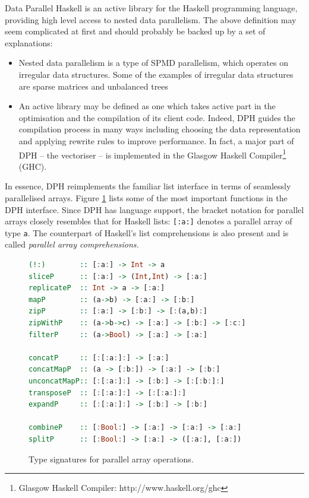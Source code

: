 \documentclass[preamble.tex]{subfiles}
\begin{document}
Data Parallel Haskell is an active library for the Haskell programming language, providing high level access to nested data parallelism. The above definition may seem complicated at first and should probably be backed up by a set of explanations:
\begin{itemize}
\item Nested data parallelism is a type of SPMD parallelism, which operates on irregular data structures. Some of the examples of irregular data structures are sparse matrices and unbalanced trees

\item An active library may be defined as one which takes active part in the optimisation and the compilation of its client code. Indeed, DPH guides the compilation process in many ways including choosing the data representation \cite{CDL09} and applying rewrite rules \cite{PTH01} to improve performance. In fact, a major part of DPH -- the vectoriser -- is implemented in the Glasgow Haskell Compiler\footnote{Glasgow Haskell Compiler: http://www.haskell.org/ghc} (GHC).

\end{itemize}
In essence, DPH reimplements the familiar list interface in terms of seamlessly parallelised arrays. Figure \ref{fig:Lit:DPH-interface-functions} lists some of the most important functions in the DPH interface. Since DPH has language support, the bracket notation for parallel arrays closely resembles that for Haskell lists: \lstinline[basicstyle={\ttfamily}]![:a:]! denotes a parallel array of type \lstinline[basicstyle={\ttfamily}]!a!. The counterpart of Haskell's list comprehensions is also present and is called \emph{parallel array comprehensions.}

\begin{figure}
\begin{lstlisting}[basicstyle={\ttfamily},language=Haskell,tabsize=4]
(!:)		:: [:a:] -> Int -> a
sliceP		:: [:a:] -> (Int,Int) -> [:a:]
replicateP	:: Int -> a -> [:a:]
mapP		:: (a->b) -> [:a:] -> [:b:]
zipP		:: [:a:] -> [:b:] -> [:(a,b):]
zipWithP	:: (a->b->c) -> [:a:] -> [:b:] -> [:c:]
filterP		:: (a->Bool) -> [:a:] -> [:a:]

concatP		:: [:[:a:]:] -> [:a:]
concatMapP	:: (a -> [:b:]) -> [:a:] -> [:b:]
unconcatMapP:: [:[:a:]:] -> [:b:] -> [:[:b:]:]
transposeP	:: [:[:a:]:] -> [:[:a:]:]
expandP		:: [:[:a:]:] -> [:b:] -> [:b:]

combineP	:: [:Bool:] -> [:a:] -> [:a:] -> [:a:]
splitP		:: [:Bool:] -> [:a:] -> ([:a:], [:a:])
\end{lstlisting}

\caption{\label{fig:Lit:DPH-interface-functions}{Type signatures for parallel array operations.}}
\end{figure}
\end{document}
